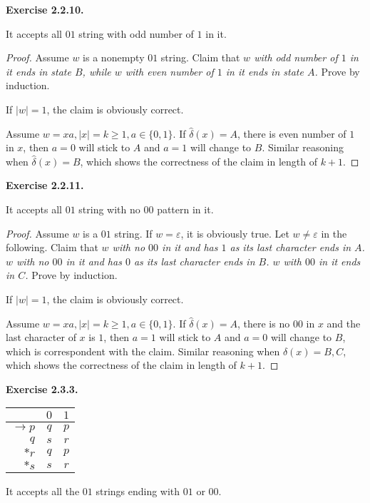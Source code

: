 \documentclass[a4paper]{article}
\newtheorem*{proof}{Proof}
\newenvironment{exercise}[1]{
	\par
	\noindent\textbf{Exercise #1.}\quad
}{
	\par
	\bigskip
}
\begin{document}
\begin{exercise}{2.2.10}
It accepts all $01$ string with odd number of $1$ in it.
\begin{proof}
    Assume $w$ is a nonempty $01$ string. Claim that \textit{$w$ with odd number of $1$ in it ends in state $B$,
    while $w$ with even number of $1$ in it ends in state $A$.} Prove by induction. \par
    If $|w|=1$, the claim is obviously correct.\par
    Assume $w=xa,|x|=k\geqslant 1,a\in\{0,1\}$. If $\hat{\delta}(x)=A$, there is even number of $1$ in $x$, then 
    $a=0$ will stick to $A$ and $a=1$ will change to $B$. Similar reasoning when $\hat{\delta}(x)=B$, which shows 
    the correctness of the claim in length of $k+1$.
\end{proof}
\end{exercise}

\begin{exercise}{2.2.11}
It accepts all $01$ string with no $00$ pattern in it.
\begin{proof}
    Assume $w$ is a $01$ string. If $w=\varepsilon$, it is obviously true. Let $w\neq\varepsilon$ in the following.
    Claim that \textit{
        $w$ with no $00$ in it and has $1$ as its last character ends in $A$.
        $w$ with no $00$ in it and has $0$ as its last character ends in $B$.
        $w$ with $00$ in it ends in $C$.
    } Prove by induction.\par
    If $|w|=1$, the claim is obviously correct.\par
    Assume $w=xa,|x|=k\geqslant 1,a\in\{0,1\}$. If $\hat{\delta}(x)=A$, there is no $00$ in $x$ and the last
    character of $x$ is $1$, then 
    $a=1$ will stick to $A$ and $a=0$ will change to $B$, which is correspondent with the claim.
    Similar reasoning when $\hat{\delta}(x)=B,C$, which shows 
    the correctness of the claim in length of $k+1$.
\end{proof}
\end{exercise}

\begin{exercise}{2.3.3}\hspace{0pt}\\
\begin{center}
\begin{tabular}{r || c | c}
& $0$ & $1$\\
\hline\hline
$\rightarrow p$ & $q$ & $p$\\
$q$ & $s$ & $r$\\
$*r$ & $q$ & $p$\\
$*s$ & $s$ & $r$
\end{tabular}
\end{center}
It accepts all the $01$ strings ending with $01$ or $00$.
\end{exercise}
\end{document}
